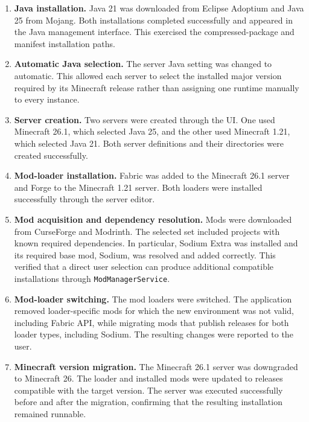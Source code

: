 \begin{enumerate}
  \item \textbf{Java installation.} Java 21 was downloaded from Eclipse Adoptium and Java 25 from Mojang. Both installations completed successfully and appeared in the Java management interface. This exercised the compressed-package and manifest installation paths.

  \item \textbf{Automatic Java selection.} The server Java setting was changed to automatic. This allowed each server to select the installed major version required by its Minecraft release rather than assigning one runtime manually to every instance.

  \item \textbf{Server creation.} Two servers were created through the UI. One used Minecraft 26.1, which selected Java 25, and the other used Minecraft 1.21, which selected Java 21. Both server definitions and their directories were created successfully.

  \item \textbf{Mod-loader installation.} Fabric was added to the Minecraft 26.1 server and Forge to the Minecraft 1.21 server. Both loaders were installed successfully through the server editor.

  \item \textbf{Mod acquisition and dependency resolution.} Mods were downloaded from CurseForge and Modrinth. The selected set included projects with known required dependencies. In particular, Sodium Extra was installed and its required base mod, Sodium, was resolved and added correctly. This verified that a direct user selection can produce additional compatible installations through \texttt{ModManagerService}.

  \item \textbf{Mod-loader switching.} The mod loaders were switched. The application removed loader-specific mods for which the new environment was not valid, including Fabric API, while migrating mods that publish releases for both loader types, including Sodium. The resulting changes were reported to the user.

  \item \textbf{Minecraft version migration.} The Minecraft 26.1 server was downgraded to Minecraft 26. The loader and installed mods were updated to releases compatible with the target version. The server was executed successfully before and after the migration, confirming that the resulting installation remained runnable.


\end{enumerate}
